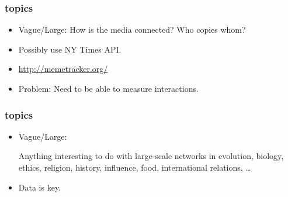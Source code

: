 \begin{frame}
  \frametitle{topics}

  \begin{itemize}
  \item
    Vague/Large:
    How is the media connected?
    Who copies whom?
  \item
    Possibly use NY Times API.
  \item 
    \url{http://memetracker.org/}
  \item 
    Problem: Need to be able to measure interactions.
  \end{itemize}

\end{frame}



\begin{frame}
  \frametitle{topics}

  \begin{itemize}
  \item
    Vague/Large:

    Anything interesting to do
    with large-scale networks
    in evolution, biology, ethics, religion, history, influence, food,
    international relations, \ldots
  \item
    Data is key.
  \end{itemize}

\end{frame}










%










